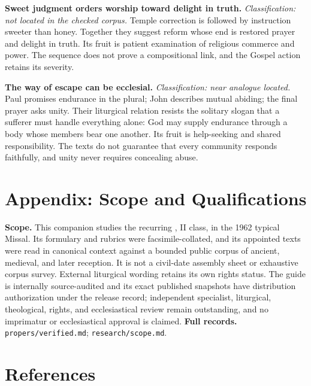 \begin{deepstudy}
\noindent\textbf{Sweet judgment orders worship toward delight in truth.\enspace{}}
\emph{Classification: not located in the checked corpus.} Temple correction is followed by instruction sweeter than honey. Together they suggest reform whose end is restored prayer and delight in truth. Its fruit is patient examination of religious commerce and power. The sequence does not prove a compositional link, and the Gospel action retains its severity.

\noindent\textbf{The way of escape can be ecclesial.\enspace{}}
\emph{Classification: near analogue located.} Paul promises endurance in the plural; John describes mutual abiding; the final prayer asks unity. Their liturgical relation resists the solitary slogan that a sufferer must handle everything alone: God may supply endurance through a body whose members bear one another. Its fruit is help-seeking and shared responsibility. The texts do not guarantee that every community responds faithfully, and unity never requires concealing abuse.



\section*{Appendix: Scope and Qualifications}

\begin{studyframe}
\textbf{Scope.} This companion studies the recurring , II class, in the 1962 typical Missal. Its formulary and rubrics were facsimile-collated, and its appointed texts were read in canonical context against a bounded public corpus of ancient, medieval, and later reception. It is not a civil-date assembly sheet or exhaustive corpus survey. External liturgical wording retains its own rights status. The guide is internally source-audited and its exact published snapshots have distribution authorization under the release record; independent specialist, liturgical, theological, rights, and ecclesiastical review remain outstanding, and no imprimatur or ecclesiastical approval is claimed. \textbf{Full records.} \nolinkurl{propers/verified.md}; \nolinkurl{research/scope.md}.
\end{studyframe}

\enlargethispage{2\baselineskip}
\section*{References}


\end{deepstudy}
